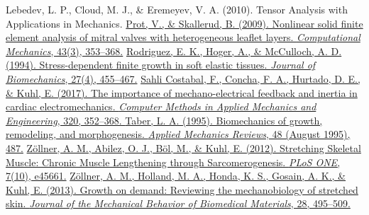 \documentclass[10pt,letterpaper,oneside]{report}
\begin{document}
\begin{thebibliography}{99}
%
Lebedev, L. P., Cloud, M. J., \& Eremeyev, V. A. (2010). Tensor Analysis with Applications in Mechanics.
%
\href{http://doi.org/10.1007/s00466-008-0310-2}{%
Prot, V., \& Skallerud, B. (2009). Nonlinear solid finite element analysis of mitral valves with heterogeneous leaflet layers. \textit{Computational Mechanics}, 43(3), 353–368.}
%
\href{http://doi.org/10.1016/0021-9290(94)90021-3}{%
Rodriguez, E. K., Hoger, A., \& McCulloch, A. D. (1994). Stress-dependent finite growth in soft elastic tissues. \textit{Journal of Biomechanics}, 27(4), 455–467.}
%
\href{http://doi.org/10.1016/j.cma.2017.03.015}{%
Sahli Costabal, F., Concha, F. A., Hurtado, D. E., \& Kuhl, E. (2017). The importance of mechano-electrical feedback and inertia in cardiac electromechanics. \textit{Computer Methods in Applied Mechanics and Engineering}, 320, 352–368. }
%
\href{http://adsabs.harvard.edu/abs/1995ApMRv..48..487T}{%
Taber, L. A. (1995). Biomechanics of growth, remodeling, and morphogenesis. \textit{Applied Mechanics Reviews}, 48 (August 1995), 487.}
%
\href{http://doi.org/10.1371/journal.pone.0045661}{%
Zöllner, A. M., Abilez, O. J., Böl, M., \& Kuhl, E. (2012). Stretching Skeletal Muscle: Chronic Muscle Lengthening through Sarcomerogenesis. \textit{PLoS ONE}, 7(10), e45661.}
%
\href{http://doi.org/10.1016/j.jmbbm.2013.03.018}{%
Zöllner, A. M., Holland, M. A., Honda, K. S., Gosain, A. K., \& Kuhl, E. (2013). Growth on demand: Reviewing the mechanobiology of stretched skin. \textit{Journal of the Mechanical Behavior of Biomedical Materials}, 28, 495–509.}
%
\end{thebibliography}
\end{document}
